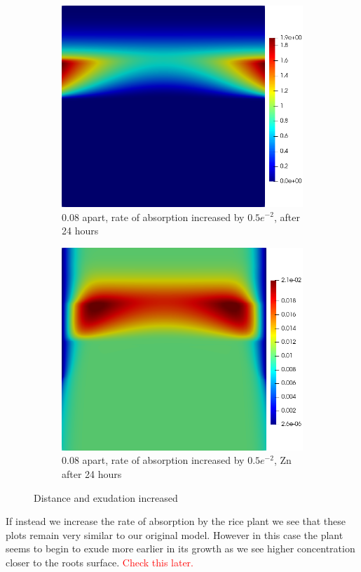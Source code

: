 \documentclass[11pt]{article}
\numberwithin{equation}{section}
\begin{document}
 \begin{figure}
     \centering
     \begin{subfigure}[t]{0.35\textwidth}
     \includegraphics[width=\textwidth]{Figures/testpics/IncreasedZnAbsorbDMA24.png}
     \caption{0.08 apart, rate of  absorption increased by $0.5e^{-2}$,  after 24 hours}
     \end{subfigure}
     \hspace{1cm}
     \begin{subfigure}[t]{0.35\textwidth}
     \includegraphics[width=\textwidth]{Figures/testpics/IncreasedZnAbsorbZn24.png}
     \caption{0.08 apart, rate of  absorption increased by $0.5e^{-2}$, Zn after 24 hours}
     \end{subfigure}
     \caption{Distance and  exudation increased}
 \end{figure}
If instead we increase the rate of  absorption by the rice plant we see that these plots remain very similar to our original model. However in this case the plant seems to begin to exude more  earlier in its growth as we see higher  concentration closer to the roots surface. \textcolor{red}{Check this later.}
\end{document}
